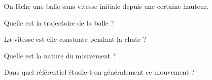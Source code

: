 \documentclass[12pt]{article}
\begin{document}
\begin{exercice}{}{}
    On lâche une balle sans vitesse initiale depuis une certaine hauteur.
    
    \begin{enumeratebf}
        \item Quelle est la trajectoire de la balle ?
        \item La vitesse est-elle constante pendant la chute ?
        \item Quelle est la nature du mouvement ?
        \item Dans quel référentiel étudie-t-on généralement ce mouvement ?
    \end{enumeratebf}
\end{exercice}
\end{document}
